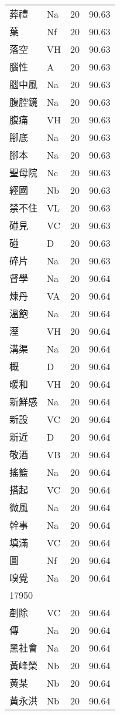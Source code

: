 \documentclass[twocolumn]{book}
\begin{document}
\begin{supertabular}{llrr}
葬禮 & Na & 20 &  90.63\\
葉 & Nf & 20 &  90.63\\
落空 & VH & 20 &  90.63\\
腦性 & A & 20 &  90.63\\
腦中風 & Na & 20 &  90.63\\
腹腔鏡 & Na & 20 &  90.63\\
腹痛 & VH & 20 &  90.63\\
腳底 & Na & 20 &  90.63\\
腳本 & Na & 20 &  90.63\\
聖母院 & Nc & 20 &  90.63\\
經國 & Nb & 20 &  90.63\\
禁不住 & VL & 20 &  90.63\\
碰見 & VC & 20 &  90.63\\
碰 & D & 20 &  90.63\\
碎片 & Na & 20 &  90.63\\
督學 & Na & 20 &  90.64\\
煉丹 & VA & 20 &  90.64\\
溫飽 & Na & 20 &  90.64\\
溼 & VH & 20 &  90.64\\
溝渠 & Na & 20 &  90.64\\
概 & D & 20 &  90.64\\
暖和 & VH & 20 &  90.64\\
新鮮感 & Na & 20 &  90.64\\
新設 & VC & 20 &  90.64\\
新近 & D & 20 &  90.64\\
敬酒 & VB & 20 &  90.64\\
搖籃 & Na & 20 &  90.64\\
搭起 & VC & 20 &  90.64\\
微風 & Na & 20 &  90.64\\
幹事 & Na & 20 &  90.64\\
填滿 & VC & 20 &  90.64\\
圓 & Nf & 20 &  90.64\\
嗅覺 & Na & 20 &  90.64\\
17950\\
剷除 & VC & 20 &  90.64\\
傳 & Na & 20 &  90.64\\
黑社會 & Na & 20 &  90.64\\
黃峰榮 & Nb & 20 &  90.64\\
黃某 & Nb & 20 &  90.64\\
黃永洪 & Nb & 20 &  90.64\\

\end{supertabular}
\end{document}

